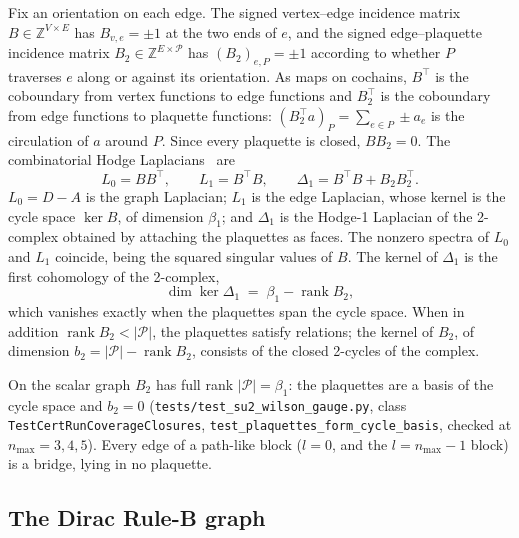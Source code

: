 \documentclass[11pt]{article}
\begin{document}
Fix an orientation on each edge.  The signed vertex--edge incidence matrix
$B\in\mathbb{Z}^{V\times E}$ has $B_{v,e}=\pm1$ at the two ends of $e$, and
the signed edge--plaquette incidence matrix
$B_2\in\mathbb{Z}^{E\times\mathcal{P}}$ has $(B_2)_{e,P}=\pm1$ according to
whether $P$ traverses $e$ along or against its orientation.  As maps on
cochains, $B^{\top}$ is the coboundary from vertex functions to edge
functions and $B_2^{\top}$ is the coboundary from edge functions to
plaquette functions: $(B_2^{\top}a)_P=\sum_{e\in P}\pm a_e$ is the
circulation of $a$ around $P$.  Since every plaquette is closed,
$BB_2=0$.  The combinatorial Hodge Laplacians~\cite{lim2020,schaub2020}
are
\begin{equation}
L_0 = BB^{\top},\qquad
L_1 = B^{\top}B,\qquad
\Delta_1 = B^{\top}B + B_2B_2^{\top}.
\label{eq:hodge_laplacians}
\end{equation}
$L_0=D-A$ is the graph Laplacian; $L_1$ is the edge Laplacian, whose kernel
is the cycle space $\ker B$, of dimension $\beta_1$; and $\Delta_1$ is the
Hodge-1 Laplacian of the 2-complex obtained by attaching the plaquettes as
faces.  The nonzero spectra of $L_0$ and $L_1$ coincide, being the squared
singular values of $B$.  The kernel of $\Delta_1$ is the first cohomology
of the 2-complex,
\begin{equation}
\dim\ker\Delta_1 \;=\; \beta_1 - \operatorname{rank}B_2,
\label{eq:h1_defect}
\end{equation}
which vanishes exactly when the plaquettes span the cycle space.  When in
addition $\operatorname{rank}B_2<|\mathcal{P}|$, the plaquettes satisfy
relations; the kernel of $B_2$, of dimension
$b_2=|\mathcal{P}|-\operatorname{rank}B_2$, consists of the closed 2-cycles
of the complex.

On the scalar graph $B_2$ has full rank $|\mathcal{P}|=\beta_1$: the
plaquettes are a basis of the cycle space and $b_2=0$
(\texttt{tests/test\_su2\_wilson\_gauge.py}, class
\texttt{TestCertRunCoverageClosures},
\texttt{test\_plaquettes\_form\_cycle\_basis}, checked at
$n_{\max}=3,4,5$).  Every edge of a path-like block ($l=0$, and the
$l=n_{\max}-1$ block) is a bridge, lying in no plaquette.

\subsection{The Dirac Rule-B graph}
\label{sec:ruleb_graph}
\end{document}
